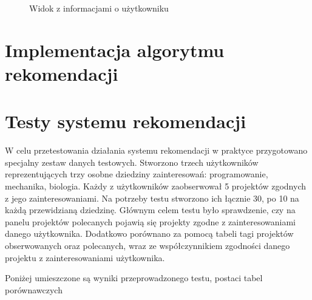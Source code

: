 \begin{figure}[h!]
	\caption{Widok z informacjami o użytkowniku}
	\centering
\end{figure}

\clearpage

\section{Implementacja algorytmu rekomendacji}

\section{Testy systemu rekomendacji}

W celu przetestowania działania systemu rekomendacji w praktyce przygotowano specjalny zestaw danych testowych. Stworzono trzech użytkowników reprezentujących trzy osobne dziedziny zainteresowań: programowanie, mechanika, biologia. Każdy z użytkowników zaobserwował 5 projektów zgodnych z jego zainteresowaniami. Na potrzeby testu stworzono ich łącznie 30, po 10 na każdą przewidzianą dziedzinę. 
Głównym celem testu było sprawdzenie, czy na panelu projektów polecanych pojawią się projekty zgodne z zainteresowaniami danego użytkownika. Dodatkowo porównano za pomocą tabeli tagi projektów obserwowanych oraz polecanych, wraz ze współczynnikiem zgodności danego projektu z zainteresowaniami użytkownika. 


Poniżej umieszczone są wyniki przeprowadzonego testu, postaci tabel porównawczych

